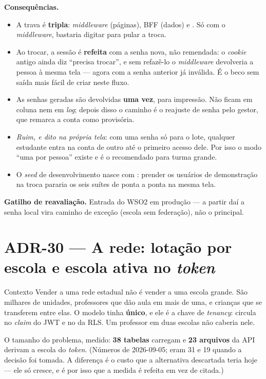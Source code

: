 \textbf{Consequências.}
\begin{itemize}
  \item A trava é \textbf{tripla}: \emph{middleware} (páginas), BFF (dados) e
    . Só com o \emph{middleware}, bastaria digitar
     para pular a troca.
  \item Ao trocar, a sessão é \textbf{refeita} com a senha nova, não remendada:
    o \emph{cookie} antigo ainda diz \enquote{precisa trocar}, e sem refazê-lo o
    \emph{middleware} devolveria a pessoa à mesma tela --- agora com a senha
    anterior já inválida. É o beco sem saída mais fácil de criar neste fluxo.
  \item As senhas geradas são devolvidas \textbf{uma vez}, para impressão. Não
    ficam em coluna nem em \emph{log}; depois disso o caminho é o reajuste de
    senha pelo gestor, que remarca a conta como provisória.
  \item \emph{Ruim, e dito na própria tela}: com uma senha só para o lote,
    qualquer estudante entra na conta de outro até o primeiro acesso dele. Por isso o
    modo \enquote{uma por pessoa} existe e é o recomendado para turma grande.
  \item O \emph{seed} de desenvolvimento nasce com :
    prender os usuários de demonstração na troca pararia os seis
    suítes de ponta a ponta na mesma tela.
\end{itemize}

\textbf{Gatilho de reavaliação.} Entrada do WSO2 em produção --- a partir daí a
senha local vira caminho de exceção (escola sem federação), não o principal.

\section{ADR-30 --- A rede: lotação por escola e escola ativa no \emph{token}}
\label{adr:rede-lotacoes}

\begin{especificacao}{Contexto}
Vender a uma rede estadual não é vender a uma escola grande. São milhares de
unidades, professores que dão aula em mais de uma, e crianças que se transferem
entre elas. O modelo tinha  \textbf{único}, e ele é a chave
de \emph{tenancy}: circula no \emph{claim}  do JWT e no
 da RLS. Um professor em duas escolas não caberia nele.

O tamanho do problema, medido: \textbf{38 tabelas} carregam  e
\textbf{23 arquivos} da API derivam a escola do \emph{token}. (Números de
2026-09-05; eram 31 e 19 quando a decisão foi tomada. A diferença é o custo que
a alternativa descartada teria hoje --- ele só cresce, e é por isso que a
medida é refeita em vez de citada.)
\end{especificacao}


